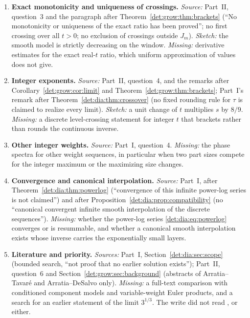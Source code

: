 \documentclass[11pt,letterpaper]{article}
\numberwithin{equation}{section}
\theoremstyle{definition}\newtheorem{definition}[theorem]{Definition}
\theoremstyle{remark}\newtheorem{remark}[theorem]{Remark}
\begin{document}
\begin{enumerate}
\item\label{det:q:monotone} \textbf{Exact monotonicity and uniqueness of crossings.} \emph{Source:} Part~II, question~3 and the paragraph after Theorem~\ref{det:grow:thm:brackets} (``No monotonicity or uniqueness of the exact ratio has been proved''; no first crossing over all $t>0$; no exclusion of crossings outside $J_m$). \emph{Sketch:} the smooth model is strictly decreasing on the window. \emph{Missing:} derivative estimates for the exact real-$t$ ratio, which uniform approximation of values does not give.
\item\label{det:q:integer} \textbf{Integer exponents.} \emph{Source:} Part~II, question~4, and the remarks after Corollary~\ref{det:grow:cor:limit} and Theorem~\ref{det:grow:thm:brackets}; Part~I's remark after Theorem~\ref{det:dia:thm:crossover} (no fixed rounding rule for $\tau$ is claimed to realize every limit). \emph{Sketch:} a unit change of $t$ multiplies $s$ by $8/9$. \emph{Missing:} a discrete level-crossing statement for integer $t$ that brackets rather than rounds the continuous inverse.
\item\label{det:q:weights} \textbf{Other integer weights.} \emph{Source:} Part~I, question~4. \emph{Missing:} the phase spectra for other weight sequences, in particular when two part sizes compete for the integer maximum or the maximizing size changes.
\item\label{det:q:convergence} \textbf{Convergence and canonical interpolation.} \emph{Source:} Part~I, after Theorem~\ref{det:dia:thm:powerlog} (``convergence of this infinite power-log series is not claimed'') and after Proposition~\ref{det:dia:prop:compatibility} (no ``canonical convergent infinite smooth interpolation of the discrete sequences''). \emph{Missing:} whether the power-log series \eqref{det:dia:eq:powerlog} converges or is resummable, and whether a canonical smooth interpolation exists whose inverse carries the exponentially small layers.
\item\label{det:q:literature} \textbf{Literature and priority.} \emph{Sources:} Part~I, Section~\ref{det:dia:sec:scope} (bounded search, ``not proof that no earlier solution exists''); Part~II, question~6 and Section~\ref{det:grow:sec:background} (abstracts of Arratia--Tavar\'e and Arratia--DeSalvo only). \emph{Missing:} a full-text comparison with conditioned component models and variable-weight Euler products, and a search for an earlier statement of the limit $3^{1/3}$. The write did not read \cite{kotesovec}, \cite{arratia-tavare} or \cite{arratia-desalvo} either.
\end{enumerate}
\end{document}
